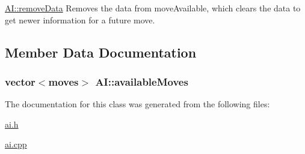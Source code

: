 \hyperlink{class_a_i_ae19027dd80147020d2aa55fbae3113b3}{A\-I\-::remove\-Data} Removes the data from move\-Available, which clears the data to get newer information for a future move. 



\subsection{Member Data Documentation}
\hypertarget{class_a_i_afbd7b83dc6eb3a47fcde351e9a6eb651}{
\subsubsection[{available\-Moves}]{\setlength{\rightskip}{0pt plus 5cm}vector$<${\bf moves}$>$ A\-I\-::available\-Moves}}\label{class_a_i_afbd7b83dc6eb3a47fcde351e9a6eb651}


The documentation for this class was generated from the following files\-:\begin{DoxyCompactItemize}
\item 
\hyperlink{ai_8h}{ai.\-h}\item 
\hyperlink{ai_8cpp}{ai.\-cpp}\end{DoxyCompactItemize}
